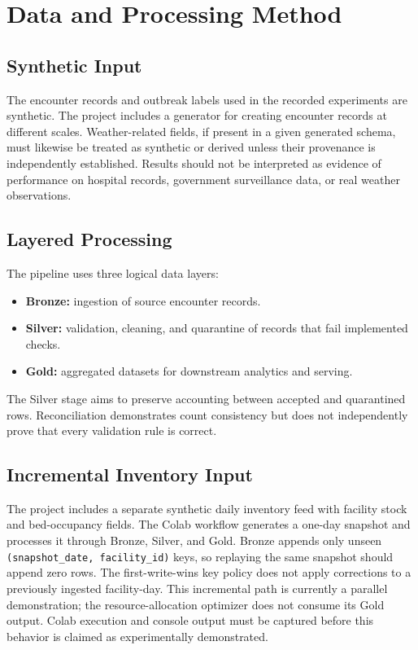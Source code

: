 \documentclass[conference]{IEEEtran}
\begin{document}
\section{Data and Processing Method}

\subsection{Synthetic Input}

The encounter records and outbreak labels used in the recorded experiments are synthetic. The project includes a generator for creating encounter records at different scales. Weather-related fields, if present in a given generated schema, must likewise be treated as synthetic or derived unless their provenance is independently established. Results should not be interpreted as evidence of performance on hospital records, government surveillance data, or real weather observations.

\subsection{Layered Processing}

The pipeline uses three logical data layers:
\begin{itemize}
    \item \textbf{Bronze:} ingestion of source encounter records.
    \item \textbf{Silver:} validation, cleaning, and quarantine of records that fail implemented checks.
    \item \textbf{Gold:} aggregated datasets for downstream analytics and serving.
\end{itemize}

The Silver stage aims to preserve accounting between accepted and quarantined rows. Reconciliation demonstrates count consistency but does not independently prove that every validation rule is correct.

\subsection{Incremental Inventory Input}

The project includes a separate synthetic daily inventory feed with facility stock and bed-occupancy fields. The Colab workflow generates a one-day snapshot and processes it through Bronze, Silver, and Gold. Bronze appends only unseen \texttt{(snapshot\_date, facility\_id)} keys, so replaying the same snapshot should append zero rows. The first-write-wins key policy does not apply corrections to a previously ingested facility-day. This incremental path is currently a parallel demonstration; the resource-allocation optimizer does not consume its Gold output. Colab execution and console output must be captured before this behavior is claimed as experimentally demonstrated.
\end{document}
